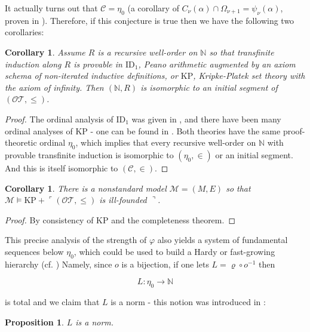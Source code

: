 \documentclass{article}
\theoremstyle{definition}
\theoremstyle{plain}
\theoremstyle{plain}
\theoremstyle{plain}
\newtheorem{proposition}[definition]{Proposition}
\theoremstyle{plain}
\newtheorem{corollary}[definition]{Corollary}
\theoremstyle{remark}
\theoremstyle{remark}
\theoremstyle{remark}
\theoremstyle{plain}
\theoremstyle{plain}
\begin{document}
It actually turns out that $\mathcal{C} = \eta_0$ (a corollary of $C_\nu(\alpha) \cap \Omega_{\nu+1} = \psi_\nu(\alpha)$, proven in \cite{buchholz}). Therefore, if this conjecture is true then we have the following two corollaries:

\begin{corollary}
Assume $R$ is a recursive well-order on $\mathbb{N}$ so that transfinite induction along $R$ is provable in $\mathrm{ID}_1$, Peano arithmetic augmented by an axiom schema of non-iterated inductive definitions, or $\mathrm{KP}$, Kripke-Platek set theory with the axiom of infinity. Then $(\mathbb{N}, R)$ is isomorphic to an initial segment of $(\mathcal{OT}, \leq)$.
\end{corollary}

\begin{proof}
The ordinal analysis of $\mathrm{ID}_1$ was given in \cite{buchholz3}, and there have been many ordinal analyses of $\mathrm{KP}$ - one can be found in \cite{jager}. Both theories have the same proof-theoretic ordinal $\eta_0$, which implies that every recursive well-order on $\mathbb{N}$ with provable transfinite induction is isomorphic to $(\eta_0, \in)$ or an initial segment. And this is itself isomorphic to $(\mathcal{C}, \in)$.
\end{proof}

\begin{corollary}
There is a nonstandard model $\mathcal{M} = (M, E)$ so that $\mathcal{M} \models \mathrm{KP} + \ulcorner (\mathcal{OT}, \leq)$ is ill-founded $\urcorner$.
\end{corollary}

\begin{proof}
By consistency of $\mathrm{KP}$ and the completeness theorem.
\end{proof}

This precise analysis of the strength of $\varphi$ also yields a system of fundamental sequences below $\eta_0$, which could be used to build a Hardy or fast-growing hierarchy (cf. \cite{buchholz2}) Namely, since $o$ is a bijection, if one lets $L = \varrho \circ o^{-1}$ then

\begin{equation}
L: \eta_0 \to \mathbb{N}
\end{equation}

is total and we claim that $L$ is a norm - this notion was introduced in \cite{buchholz4}:

\begin{proposition}
$L$ is a norm.
\end{proposition}
\end{document}
